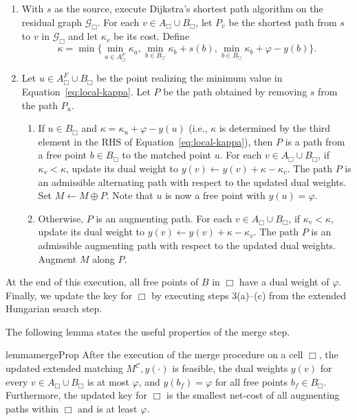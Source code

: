 \documentclass[11pt,onecolumn]{article}
\def\mcC{{\mathcal{C}}}
\def\mcG{{\mathcal{G}}}
\newcommand{\freeofcell}[2]{{#1}_{#2}^F}
\newcommand{\cell}{\Box}
\newcommand{\ymax}{\varphi}
\begin{document}
\begin{enumerate}
    \item With $s$ as the source, execute Dijkstra's shortest path algorithm on the residual graph $\mcG_\cell$. For each $v \in A_\cell\cup B_\cell$, let $P_v$ be the shortest path from $s$ to $v$ in $\mcG_\cell$ and let $\kappa_v$ be its cost. Define
\begin{equation}\label{eq:local-kappa}
    \kappa = \min\{ \min_{a\in \freeofcell{A}{\cell}}\kappa_a, \min_{b\in B_\cell}\kappa_b + s(b), \min_{b\in B_\cell}\kappa_b + \ymax - y(b)\}.
\end{equation}


\item Let $u\in\freeofcell{A}{\cell}\cup B_\cell$ be the point realizing the minimum value in Equation~\eqref{eq:local-kappa}. Let $P$ be the path obtained by removing $s$ from the path $P_u$.
\begin{enumerate}
    \item If $u\in B_\cell$ and $\kappa=\kappa_u+\ymax-y(u)$ (i.e., $\kappa$ is determined by the third element in the RHS of Equation~\eqref{eq:local-kappa}), then $P$ is a path from a free point $b\in B_\cell$ to the matched point $u$. For each $v \in A_\cell\cup B_\cell$, if $\kappa_v < \kappa$, update its dual weight to $y(v)\leftarrow y(v)+\kappa - \kappa_v$. The path $P$ is an admissible alternating path with respect to the updated dual weights. Set $M\leftarrow M\oplus P$. Note that $u$ is now a free point with $y(u)=\ymax$.
    \item Otherwise, $P$ is an augmenting path. For each $v \in A_\cell\cup B_\cell$, if $\kappa_v < \kappa$, update its dual weight to $y(v)\leftarrow y(v)+\kappa - \kappa_v$. The path $P$ is an admissible augmenting path with respect to the updated dual weights. Augment $M$ along $P$.
\end{enumerate}
\end{enumerate}
At the end of this execution, all free points of $B$ in $\cell$ have a dual weight of $\ymax$. Finally, we update the key for $\cell$ by executing steps 3(a)--(c) from the extended Hungarian search step. 



The following lemma states the useful properties of the merge step.

\begin{restatable}{lemma}{mergeProp}\label{lemma:merge_properties}
After the execution of the merge procedure on a cell $\cell$,
the updated extended matching $M^{\mcC}, y(\cdot)$ is feasible, the dual weights $y(v)$ for every $v \in A_\cell\cup B_\cell$ is at most $\ymax$, and $y(b_f)=\ymax$ for all free points $b_f\in B_\cell$. Furthermore, the updated key for $\cell$ is the smallest net-cost of all augmenting paths within $\cell$ and is at least $\ymax$.
\end{restatable}
\end{document}
